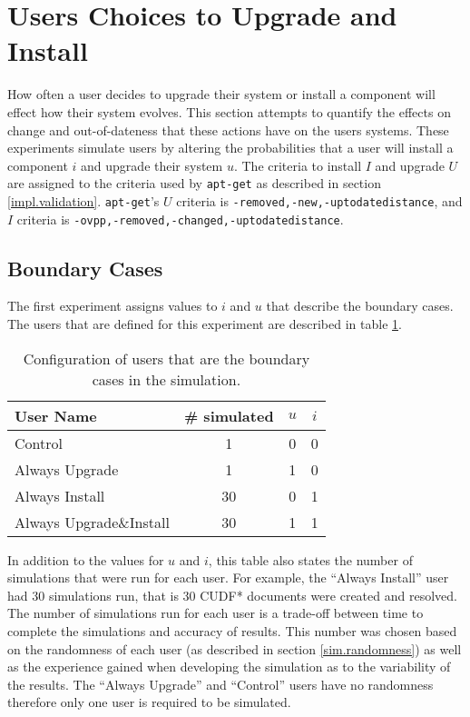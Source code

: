 \section{Users Choices to Upgrade and Install}
\label{exp.q1}
How often a user decides to upgrade their system or install a component will effect how their system evolves.
This section attempts to quantify the effects on change and out-of-dateness that these actions have on the users systems.
These experiments simulate users by altering the probabilities that a user will install a component $i$ and upgrade their system $u$.
The criteria to install $I$ and upgrade $U$ are assigned to the criteria used by \texttt{apt-get} as described in section \ref{impl.validation}. 
\texttt{apt-get}'s $U$ criteria is \texttt{-removed,-new,-uptodatedistance}, and $I$ criteria is \texttt{-ovpp,-removed,-changed,-uptodatedistance}.  

\subsection{Boundary Cases}
The first experiment assigns values to $i$ and $u$ that describe the boundary cases.
The users that are defined for this experiment are described in table \ref{exp.tblextremeusers}.
\begin{table}[h!]
\centering
\begin{tabular}{|l | c | c | c |}
\hline
User Name 				 	& \# simulated 	& $u$ 		& $i$ 			\\ \hline
Control						& 1 			& 0			& 0				\\
Always Upgrade				& 1 			& 1			& 0				 \\
Always Install 				& 30 			& 0			& 1				 \\
Always Upgrade\&Install 	& 30 			& 1			& 1				\\ \hline
\end{tabular}
\caption{Configuration of users that are the boundary cases in the simulation.}
\label{exp.tblextremeusers}
\end{table}
In addition to the values for $u$ and $i$, this table also states the number of simulations that were run for each user.
For example, the ``Always Install'' user had 30 simulations run, that is 30 CUDF* documents were created and resolved.
The number of simulations run for each user is a trade-off between time to complete the simulations and accuracy of results.
This number was chosen based on the randomness of each user (as described in section \ref{sim.randomness}) 
as well as the experience gained when developing the simulation as to the variability of the results.
The ``Always Upgrade'' and ``Control'' users have no randomness therefore only one user is required to be simulated.

